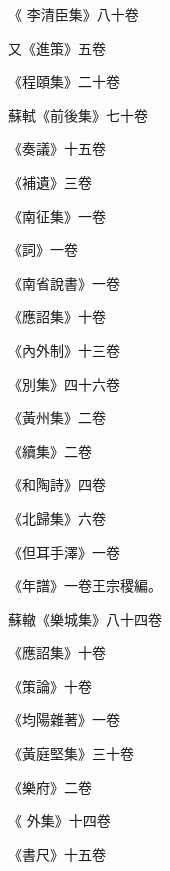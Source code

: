 \begin{pinyinscope}
 《
 李清臣集》八十卷



 又《進策》五卷



 《程頤集》二十卷



 蘇軾《前後集》七十卷



 《奏議》十五卷



 《補遺》三卷



 《南征集》一卷



 《詞》一卷



 《南省說書》一卷



 《應詔集》十卷



 《內外制》十三卷



 《別集》四十六卷



 《黃州集》二卷



 《續集》二卷



 《和陶詩》四卷



 《北歸集》六卷



 《但耳手澤》一卷



 《年譜》一卷王宗稷編。



 蘇轍《樂城集》八十四卷



 《應詔集》十卷



 《策論》十卷



 《均陽雜著》一卷



 《黃庭堅集》三十卷



 《樂府》二卷



 《
 外集》十四卷



 《書尺》十五卷




\end{pinyinscope}
